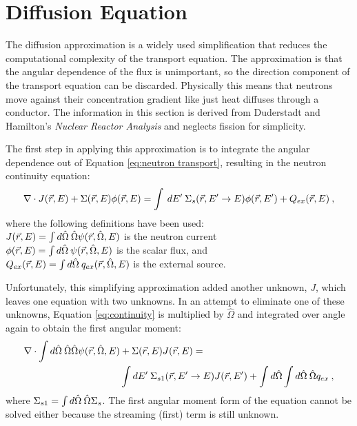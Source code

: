 
\chapter{Diffusion Equation}
\label{sec:AppendixA}
The diffusion approximation is a widely used simplification that reduces the computational complexity of the transport equation. The approximation is that the angular dependence of the flux is unimportant, so the direction component of the transport equation can be discarded. Physically this means that neutrons move against their concentration gradient like just heat diffuses through a conductor. The information in this section is derived from Duderstadt and Hamilton's \emph{Nuclear Reactor Analysis} \cite{Duderstadt1976} and neglects fission for simplicity. 

The first step in applying this approximation is to integrate the angular dependence out of Equation \eqref{eq:neutron transport}, resulting in the neutron continuity equation:
%
\begin{equation}
  \nabla \cdot J(\vec{r},E) + \Sigma(\vec{r},E)\phi(\vec{r},E) = \int \:dE' \:\Sigma_{s}(\vec{r}, E' \to E)\phi(\vec{r},E') + Q_{ex}(\vec{r},E) \:,
  \label{eq:continuity} 
\end{equation}
%
where the following definitions have been used:\\
\indent $J(\vec{r},E) = \int d\hat{\Omega} \:\hat{\Omega} \psi(\vec{r}, \hat{\Omega}, E)$ is the neutron current \\
\indent  $\phi(\vec{r},E) = \int d\hat{\Omega} \:\psi(\vec{r}, \hat{\Omega}, E)$ is the scalar flux, and \\
\indent $Q_{ex} (\vec{r},E)= \int d\hat{\Omega} \:q_{ex}(\vec{r}, \hat{\Omega}, E)$ is the external source.

Unfortunately, this simplifying approximation added another unknown, $J$, which leaves one equation with two unknowns. In an attempt to eliminate one of these unknowns, Equation \eqref{eq:continuity} is multiplied by $\hat{\Omega}$ and integrated over angle again to obtain the first angular moment:
%
\begin{align}
  \nabla \cdot \int  d\hat{\Omega} \:\hat{\Omega} \hat{\Omega} \psi(\vec{r}, \hat{\Omega}, E) &+ \Sigma(\vec{r},E) J(\vec{r},E)= \nonumber \\
  &\int dE' \:\Sigma_{s1}(\vec{r}, E' \to E)J(\vec{r},E') + \int d\hat{\Omega} \int d\hat{\Omega} \:\hat{\Omega} q_{ex} \:,
  \label{eq:current1}
\end{align}
%
where $\Sigma_{s1}  = \int d\hat{\Omega} \:\hat{\Omega} \Sigma_{s}$. The first angular moment form of the equation cannot be solved either because the streaming (first) term is still unknown. 

